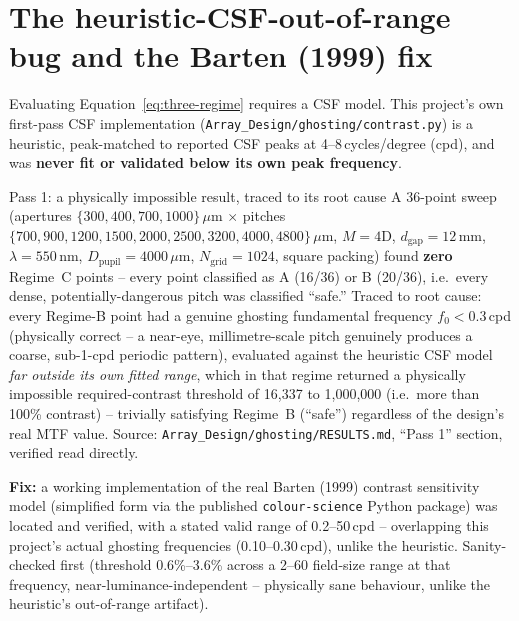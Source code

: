 \section{The heuristic-CSF-out-of-range bug and the Barten (1999) fix}
\label{sec:barten}
Evaluating Equation~\ref{eq:three-regime} requires a CSF model. This project's own
first-pass CSF implementation (\texttt{Array\_Design/ghosting/contrast.py}) is a
heuristic, peak-matched to reported CSF peaks at 4--8\,cycles/degree (cpd), and was
\textbf{never fit or validated below its own peak frequency}.

\begin{warnbox}{Pass 1: a physically impossible result, traced to its root cause}
A 36-point sweep (apertures $\{300,400,700,1000\}\,\mu$m $\times$ pitches
$\{700,900,1200,1500,2000,2500,3200,4000,4800\}\,\mu$m, $M=4$D,
$d_{\mathrm{gap}}=12$\,mm, $\lambda=550$\,nm, $D_{\mathrm{pupil}}=4000\,\mu$m,
$N_{\mathrm{grid}}=1024$, square packing) found \textbf{zero} Regime~C points -- every
point classified as A (16/36) or B (20/36), i.e.\ every dense, potentially-dangerous
pitch was classified ``safe.'' Traced to root cause: every Regime-B point had a genuine
ghosting fundamental frequency $f_0<0.3$\,cpd (physically correct -- a near-eye,
millimetre-scale pitch genuinely produces a coarse, sub-1-cpd periodic pattern),
evaluated against the heuristic CSF model \emph{far outside its own fitted range}, which
in that regime returned a physically impossible required-contrast threshold of
16{,}337 to 1{,}000{,}000 (i.e.\ more than 100\% contrast) -- trivially satisfying
Regime~B (``safe'') regardless of the design's real MTF value. Source:
\texttt{Array\_Design/ghosting/RESULTS.md}, ``Pass 1'' section, verified read directly.
\end{warnbox}

\textbf{Fix:} a working implementation of the real Barten (1999) contrast sensitivity
model \citep{barten1999,barten2003} (simplified form via the published
\texttt{colour-science} Python package) was located and verified, with a stated valid
range of 0.2--50\,cpd -- overlapping this project's actual ghosting frequencies
(0.10--0.30\,cpd), unlike the heuristic. Sanity-checked first (threshold 0.6\%--3.6\%
across a 2--60\textdegree{} field-size range at that frequency, near-luminance-independent
-- physically sane behaviour, unlike the heuristic's out-of-range artifact).

